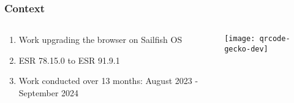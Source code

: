 \documentclass[
	notes=none,
	aspectratio=169
]{beamer}
\begin{document}

\begin{frame}
\frametitle{Context}

\begin{columns}[T]
\begin{column}[T]{0.7\textwidth}
\setlength{\parskip}{0.5em}

\vspace{2.0cm}
\begin{enumerate}
\setlength{\parskip}{0.5em}
\item Work upgrading the browser on Sailfish OS
\item ESR 78.15.0 to ESR 91.9.1
\item Work conducted over 13 months: August 2023 - September 2024
\end{enumerate}

\end{column}
\begin{column}[T]{0.3\textwidth}
\setlength{\parskip}{0.5em}

\vspace{0.5cm}


\vspace{0.5cm}
{\centering

\texttt{[image: qrcode-gecko-dev]}

\vspace{-0.1cm}

}

\end{column}
\end{columns}

\end{frame}
\note{
}

\end{document}
